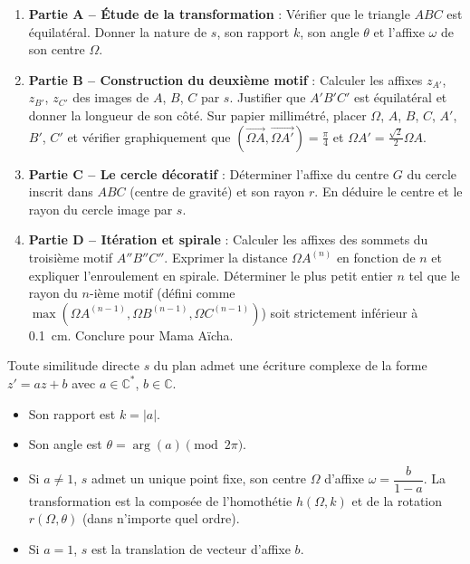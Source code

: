 \documentclass[11pt]{article}
\newcommand{\cle}[1]{{\popxbold\color{popdark}#1}}
\newcounter{popsec}
\newcounter{popsub}
\newcommand{\courssub}[1]{%
  \stepcounter{popsub}%
  \par\vspace{9pt}\noindent{\popxbold\fontsize{11.5}{13}\selectfont\color{popink}{\color{poporange}\thepopsec.\thepopsub}\hspace{6pt}#1}\par\nopagebreak\vspace{4pt}
}
\begin{document}
\begin{enumerate}
\item \textbf{Partie A -- Étude de la transformation} : Vérifier que le triangle $ABC$ est équilatéral. Donner la nature de $s$, son rapport $k$, son angle $\theta$ et l'affixe $\omega$ de son centre $\Omega$.
\item \textbf{Partie B -- Construction du deuxième motif} : Calculer les affixes $z_{A'}$, $z_{B'}$, $z_{C'}$ des images de $A$, $B$, $C$ par $s$. Justifier que $A'B'C'$ est équilatéral et donner la longueur de son côté. Sur papier millimétré, placer $\Omega$, $A$, $B$, $C$, $A'$, $B'$, $C'$ et vérifier graphiquement que $(\overrightarrow{\Omega A},\overrightarrow{\Omega A'}) = \frac{\pi}{4}$ et $\Omega A' = \frac{\sqrt{2}}{2}\Omega A$.
\item \textbf{Partie C -- Le cercle décoratif} : Déterminer l'affixe du centre $G$ du cercle inscrit dans $ABC$ (centre de gravité) et son rayon $r$. En déduire le centre et le rayon du cercle image par $s$.
\item \textbf{Partie D -- Itération et spirale} : Calculer les affixes des sommets du troisième motif $A''B''C''$. Exprimer la distance $\Omega A^{(n)}$ en fonction de $n$ et expliquer l'enroulement en spirale. Déterminer le plus petit entier $n$ tel que le rayon du $n$-ième motif (défini comme $\max(\Omega A^{(n-1)},\Omega B^{(n-1)},\Omega C^{(n-1)})$) soit strictement inférieur à \SI{0,1}{cm}. Conclure pour Mama Aïcha.
\end{enumerate}

\courssub{Ressources à mobiliser}

\begin{propriete}
Toute similitude directe $s$ du plan admet une écriture complexe de la forme $z' = a z + b$ avec $a \in \mathbb{C}^*$, $b \in \mathbb{C}$.
\begin{itemize}
\item Son \cle{rapport} est $k = |a|$.
\item Son \cle{angle} est $\theta = \arg(a) \pmod{2\pi}$.
\item Si $a \neq 1$, $s$ admet un unique point fixe, son \cle{centre} $\Omega$ d'affixe $\omega = \dfrac{b}{1-a}$. La transformation est la composée de l'homothétie $h(\Omega, k)$ et de la rotation $r(\Omega, \theta)$ (dans n'importe quel ordre).
\item Si $a = 1$, $s$ est la translation de vecteur d'affixe $b$.
\end{itemize}
\end{propriete}
\end{document}
